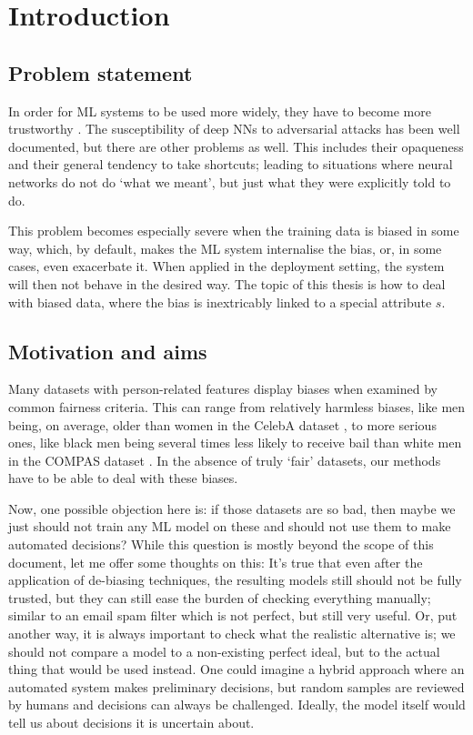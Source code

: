 \chapter{Introduction}\label{ch:introduction}
\section{Problem statement}
In order for \ac{ML} systems to be used more widely,
they have to become more trustworthy \citep{hleg2019ethics}.
The susceptibility of deep \acp{NN} to adversarial attacks has been well documented, but there are other problems as well.
This includes their opaqueness and their general tendency to take shortcuts;
leading to situations where neural networks do not do `what we meant', but just what they were explicitly told to do.

This problem becomes especially severe when the training data is biased in some way,
which, by default, makes the \ac{ML} system internalise the bias, or, in some cases, even exacerbate it.
When applied in the deployment setting, the system will then not behave in the desired way.
The topic of this thesis is how to deal with biased data,
where the bias is inextricably linked to a special attribute $s$.

\section{Motivation and aims}
Many datasets with person-related features display biases when examined by common fairness criteria.
This can range from relatively harmless biases,
like men being, on average, older than women in the CelebA dataset \citep{liu2015faceattributes},
to more serious ones,
like black men being several times less likely to receive bail than white men in the COMPAS dataset \citep{angwin2016machine}.
In the absence of truly `fair' datasets, our methods have to be able to deal with these biases.

Now, one possible objection here is:
if those datasets are so bad,
then maybe we just should not train any \ac{ML} model on these and should not use them to make automated decisions?
While this question is mostly beyond the scope of this document, let me offer some thoughts on this:
It's true that even after the application of de-biasing techniques,
the resulting models still should not be fully trusted,
but they can still ease the burden of checking everything manually;
similar to an email spam filter which is not perfect, but still very useful.
Or, put another way, it is always important to check what the realistic alternative is;
we should not compare a model to a non-existing perfect ideal, but to the actual thing that would be used instead.
One could imagine a hybrid approach where an automated system makes preliminary decisions,
but random samples are reviewed by humans and decisions can always be challenged.
Ideally, the model itself would tell us about decisions it is uncertain about.

